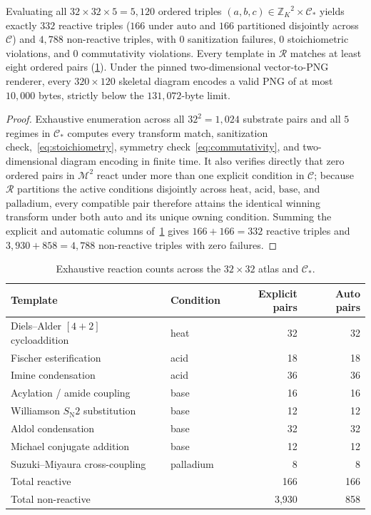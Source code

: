 \documentclass[11pt,a4paper]{article}
\theoremstyle{plain}
\theoremstyle{definition}
\theoremstyle{remark}
\newcommand{\Z}{\mathbb{Z}}
\newcommand{\Atlas}{\mathcal{M}}
\newcommand{\Reacts}{\mathcal{R}}
\newcommand{\Conds}{\mathcal{C}}
\newcommand{\SNtwo}{S_{\mathrm{N}}2}
\begin{document}
\begin{proposition}\label{prop:chem-certificate}
  Evaluating all \( 32 \times 32 \times 5 = 5{,}120 \) ordered triples
  \( (a, b, c) \in {\Z_K}^2 \times \Conds_* \) yields exactly \( 332 \) reactive triples
  (\( 166 \) under \( \text{auto} \) and \( 166 \) partitioned disjointly across
  \( \Conds \)) and \( 4{,}788 \) non-reactive triples, with \( 0 \) sanitization failures,
  \( 0 \) stoichiometric violations, and \( 0 \) commutativity violations. Every template in
  \( \Reacts \) matches at least eight ordered pairs (\cref{tab:reactions}). Under the pinned
  two-dimensional vector-to-PNG renderer, every \( 320 \times 120 \) skeletal diagram encodes a
  valid PNG of at most \( 10{,}000 \) bytes, strictly below the \( 131{,}072 \)-byte limit.
\end{proposition}
\begin{proof}
  Exhaustive enumeration across all \( 32^2 = 1{,}024 \) substrate pairs and all \( 5 \) regimes
  in \( \Conds_* \) computes every transform match, sanitization check,~\eqref{eq:stoichiometry},
  symmetry check~\eqref{eq:commutativity}, and two-dimensional diagram encoding in finite time.
  It also verifies directly that zero ordered pairs in \( \Atlas^2 \) react under more than one
  explicit condition in \( \Conds \); because \( \Reacts \) partitions the active conditions
  disjointly across \( \text{heat} \), \( \text{acid} \), \( \text{base} \), and
  \( \text{palladium} \), every compatible pair therefore attains the identical winning
  transform under both \( \text{auto} \) and its unique owning condition. Summing the explicit and
  automatic columns of~\cref{tab:reactions} gives \( 166 + 166 = 332 \) reactive triples and
  \( 3{,}930 + 858 = 4{,}788 \) non-reactive triples with zero failures.
\end{proof}

\begin{table}[t]
  \centering
  \caption{Exhaustive reaction counts across the \( 32 \times 32 \) atlas and \( \Conds_* \).\label{tab:reactions}}
  \begin{tabular}{@{}llrr@{}}
    \toprule
    Template & Condition & Explicit pairs & Auto pairs \\
    \midrule
    Diels--Alder \([4 + 2]\) cycloaddition & heat & 32 & 32 \\
    Fischer esterification & acid & 18 & 18 \\
    Imine condensation & acid & 36 & 36 \\
    Acylation / amide coupling & base & 16 & 16 \\
    Williamson \( \SNtwo \) substitution & base & 12 & 12 \\
    Aldol condensation & base & 32 & 32 \\
    Michael conjugate addition & base & 12 & 12 \\
    Suzuki--Miyaura cross-coupling & palladium & 8 & 8 \\
    \midrule
    Total reactive & & 166 & 166 \\
    Total non-reactive & & 3{,}930 & 858 \\
    \bottomrule
  \end{tabular}
\end{table}
\end{document}
